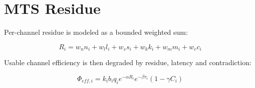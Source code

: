 \section{MTS Residue}

Per-channel residue is modeled as a bounded weighted sum:

\[
R_i = w_n n_i + w_l l_i + w_s s_i + w_k k_i + w_m m_i + w_c c_i
\]

Usable channel efficiency is then degraded by residue, latency and contradiction:

\[
\Phi_{eff,i} = k_i b_i q_i e^{-\alpha R_i} e^{-\beta \tau_i} (1 - \gamma C_i)
\]

